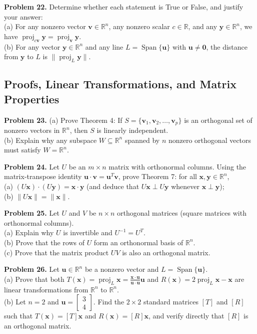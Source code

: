 \documentclass[11pt, letterpaper]{article}
\theoremstyle{definition}
\theoremstyle{remark}
\begin{document}
\textbf{Problem 22.} Determine whether each statement is True or False, and justify your answer: \\
(a) For any nonzero vector $\mathbf{v} \in \mathbb{R}^n$, any nonzero scalar $c \in \mathbb{R}$, and any $\mathbf{y} \in \mathbb{R}^n$, we have $\operatorname{proj}_{c\mathbf{v}} \mathbf{y} = \operatorname{proj}_{\mathbf{v}} \mathbf{y}$. \\
(b) For any vector $\mathbf{y} \in \mathbb{R}^n$ and any line $L = \operatorname{Span}\{\mathbf{u}\}$ with $\mathbf{u} \neq \mathbf{0}$, the distance from $\mathbf{y}$ to $L$ is $\|\operatorname{proj}_L \mathbf{y}\|$.

\subsection{Proofs, Linear Transformations, and Matrix Properties}

\textbf{Problem 23.} (a) Prove Theorem 4: If $S = \{\mathbf{v}_1, \mathbf{v}_2, \dots, \mathbf{v}_p\}$ is an orthogonal set of nonzero vectors in $\mathbb{R}^n$, then $S$ is linearly independent. \\
(b) Explain why any subspace $W \subseteq \mathbb{R}^n$ spanned by $n$ nonzero orthogonal vectors must satisfy $W = \mathbb{R}^n$.

\textbf{Problem 24.} Let $U$ be an $m \times n$ matrix with orthonormal columns. Using the matrix-transpose identity $\mathbf{u} \cdot \mathbf{v} = \mathbf{u}^T \mathbf{v}$, prove Theorem 7: for all $\mathbf{x}, \mathbf{y} \in \mathbb{R}^n$, \\
(a) $(U\mathbf{x}) \cdot (U\mathbf{y}) = \mathbf{x} \cdot \mathbf{y}$ (and deduce that $U\mathbf{x} \perp U\mathbf{y}$ whenever $\mathbf{x} \perp \mathbf{y}$); \\
(b) $\|U\mathbf{x}\| = \|\mathbf{x}\|$.

\textbf{Problem 25.} Let $U$ and $V$ be $n \times n$ orthogonal matrices (square matrices with orthonormal columns). \\
(a) Explain why $U$ is invertible and $U^{-1} = U^T$. \\
(b) Prove that the rows of $U$ form an orthonormal basis of $\mathbb{R}^n$. \\
(c) Prove that the matrix product $UV$ is also an orthogonal matrix.

\textbf{Problem 26.} Let $\mathbf{u} \in \mathbb{R}^n$ be a nonzero vector and $L = \operatorname{Span}\{\mathbf{u}\}$. \\
(a) Prove that both $T(\mathbf{x}) = \operatorname{proj}_L \mathbf{x} = \frac{\mathbf{x} \cdot \mathbf{u}}{\mathbf{u} \cdot \mathbf{u}}\mathbf{u}$ and $R(\mathbf{x}) = 2\operatorname{proj}_L \mathbf{x} - \mathbf{x}$ are linear transformations from $\mathbb{R}^n$ to $\mathbb{R}^n$. \\
(b) Let $n = 2$ and $\mathbf{u} = \begin{bmatrix} 3 \\ 4 \end{bmatrix}$. Find the $2 \times 2$ standard matrices $[T]$ and $[R]$ such that $T(\mathbf{x}) = [T]\mathbf{x}$ and $R(\mathbf{x}) = [R]\mathbf{x}$, and verify directly that $[R]$ is an orthogonal matrix.
\end{document}
